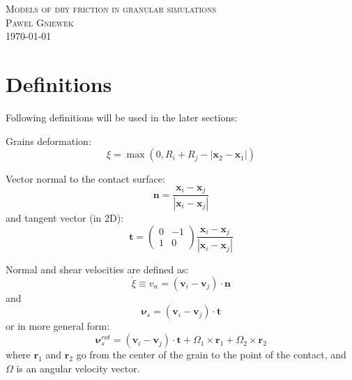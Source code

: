 \documentclass[10pt,a4paper]{article}
\begin{document}
\begin{center}
\textsc{\Large Models of dry friction in granular simulations}\\[1.0cm]
\textsc{\LARGE Pawel Gniewek}\\[1.0cm]
\vspace{0.5cm}
\today

\end{center}

\newpage

\section{Definitions}
Following definitions will be used in the later sections:

Grains deformation:
\begin{equation}
 \xi = \max(0, R_i + R_j - |\mathbf{x}_2 - \mathbf{x}_1|)
\end{equation}

Vector normal to the contact surface:
\begin{equation}
 \mathbf{n} = \frac{\mathbf{x}_{i} - \mathbf{x}_j}{|\mathbf{x}_{i} - \mathbf{x}_j|}
\end{equation}
and tangent vector (in 2D):
\begin{equation}
 \mathbf{t} = \begin{pmatrix} 0 & -1 \\ 1 & 0 \end{pmatrix} \frac{\mathbf{x}_{i} - \mathbf{x}_j}{|\mathbf{x}_{i} - \mathbf{x}_j|}
\end{equation}


Normal and shear velocities are defined as:
\begin{equation}
 \dot{\xi} \equiv v_n = (\mathbf{v}_i - \mathbf{v}_j) \cdot \mathbf{n}
\end{equation}
and
\begin{equation} \label{eq:vs1}
 \mathbf{\nu}_s = (\mathbf{v}_i - \mathbf{v}_j) \cdot \mathbf{t}
\end{equation}
or in more general form:
\begin{equation}  \label{eq:vs2}
 \mathbf{\nu}^{rot}_s = (\mathbf{v}_i - \mathbf{v}_j) \cdot \mathbf{t} + \Omega_1 \times \mathbf{r}_1 + \Omega_2 \times \mathbf{r}_2
\end{equation}
where $\mathbf{r}_1$ and $\mathbf{r}_2$ go from the center of the grain to the point of the contact, and $\Omega$ is an angular velocity vector.
\end{document}
